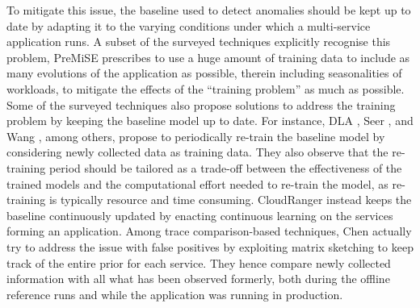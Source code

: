 To mitigate this issue, the baseline used to detect anomalies should be kept up to date by adapting it to the varying conditions under which a multi-service application runs.
A subset of the surveyed techniques explicitly recognise this problem, \eg PreMiSE \cite{33_Mariani2020_PredictingFailures} prescribes to use a huge amount of training data to include as many evolutions of the application as possible, therein including seasonalities of workloads, to mitigate the effects of the \enquote{training problem} as much as possible.
Some of the surveyed techniques also propose solutions to address the training problem by keeping the baseline model up to date.
For instance, DLA \cite{14_Samir2019_DLA}, Seer \cite{17_Gan2019_Seer}, and Wang \etal \cite{26_Wang2020_WorkflowAwareFaultDiagnosis}, among others, propose to periodically re-train the baseline model by considering newly collected data as training data.
They also observe that the re-training period should be tailored as a trade-off between the effectiveness of the trained models and the computational effort needed to re-train the model, as re-training is typically resource and time consuming. 
CloudRanger \cite{29_Wang2018_CloudRanger} instead keeps the baseline continuously updated by enacting continuous learning on the services forming an application.
Among trace comparison-based techniques, Chen \etal \cite{39_Chen2020_MatrixSketchBasedAnomalyDetection} actually try to address the issue with false positives by exploiting matrix sketching to keep track of the entire prior for each service.
They hence compare newly collected information with all what has been observed formerly, both during the offline reference runs and while the application was running in production.

